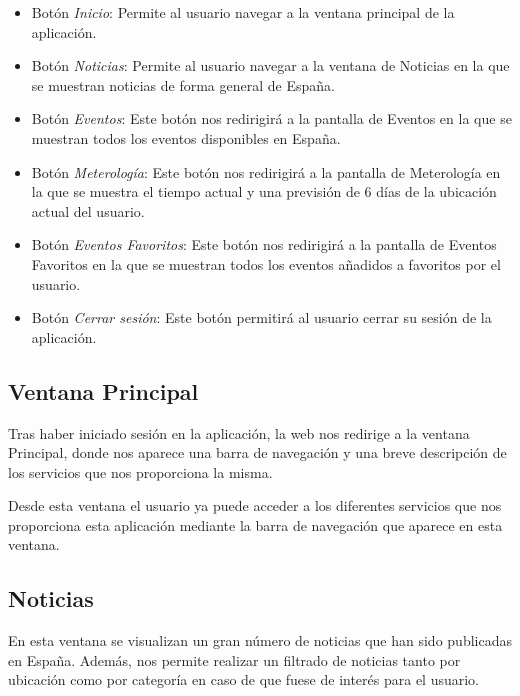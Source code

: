 \begin{itemize}
    \item Botón \textit{Inicio}: Permite al usuario navegar a la ventana principal de la aplicación.
    \item Botón \textit{Noticias}: Permite al usuario navegar a la ventana de Noticias en la que se muestran noticias de forma general de España.
    \item Botón \textit{Eventos}: Este botón nos redirigirá a la pantalla de Eventos en la que se muestran todos los eventos disponibles en España.
    \item Botón \textit{Meterología}: Este botón nos redirigirá a la pantalla de Meterología en la que se muestra el tiempo actual y una previsión de 6 días de la ubicación actual del usuario.
    \item Botón \textit{Eventos Favoritos}: Este botón nos redirigirá a la pantalla de Eventos Favoritos en la que se muestran todos los eventos añadidos a favoritos por el usuario.
    \item Botón \textit{Cerrar sesión}: Este botón permitirá al usuario cerrar su sesión de la aplicación.
\end{itemize}

\subsection{Ventana Principal}


Tras haber iniciado sesión en la aplicación, la web nos redirige a la ventana  Principal, donde nos aparece una barra de navegación y una breve descripción de los servicios que nos proporciona la misma.

Desde esta ventana el usuario ya puede acceder a los diferentes servicios que nos proporciona esta aplicación mediante la barra de navegación que aparece en esta ventana.

\newpage
\subsection{Noticias}


En esta ventana se visualizan un gran número de  noticias que han sido publicadas en España. Además, nos permite realizar un filtrado de noticias tanto por ubicación como por categoría en caso de que fuese de interés para el usuario.

